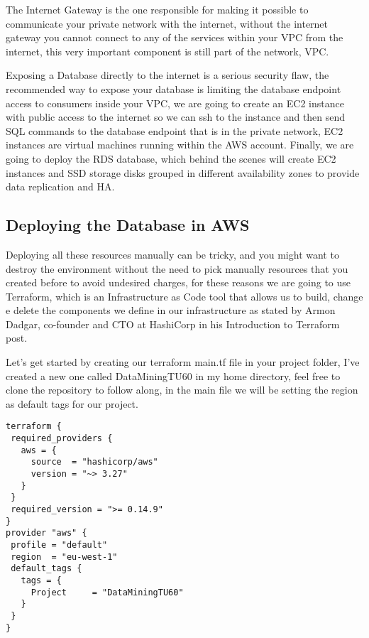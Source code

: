 \documentclass{article}
\begin{document}
The Internet Gateway is the one responsible for making it possible to communicate your private network with the internet, without the internet gateway you cannot connect to any of the services within your VPC from the internet,  this very important component is still part of the network, VPC. 

Exposing a Database directly to the internet is a serious security flaw, the recommended way to expose your database is limiting the database endpoint access to consumers inside your VPC, we are going to create an EC2 instance with public access to the internet so we can ssh to the instance and then send SQL commands to the database endpoint that is in the private network, EC2 instances are virtual machines running within the AWS account.
Finally, we are going to deploy the RDS database, which behind the scenes will create EC2 instances and SSD storage disks grouped in different availability zones to provide data replication and HA. 


\subsection{Deploying the Database in AWS}

Deploying all these resources manually can be tricky, and you might want to destroy the environment without the need to pick manually resources that you created before to avoid undesired charges, for these reasons we are going to use Terraform, which is an Infrastructure as Code tool that allows us to build, change e delete the components we define in our infrastructure as stated by Armon Dadgar, co-founder and CTO at HashiCorp in his Introduction to Terraform post.  

Let's get started by creating our terraform main.tf file in your project folder, I’ve created a new one called DataMiningTU60 in my home directory, feel free to clone the repository to follow along, in the main file we will be setting the region as default tags for our project. 

\begin{lstlisting}[caption=Terraform main file]
terraform {
 required_providers {
   aws = {
     source  = "hashicorp/aws"
     version = "~> 3.27"
   }
 }
 required_version = ">= 0.14.9"
}
provider "aws" {
 profile = "default"
 region  = "eu-west-1"
 default_tags {
   tags = {
     Project     = "DataMiningTU60"
   }
 }
}

\end{lstlisting}
\end{document}
